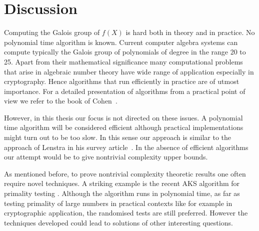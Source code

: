 \documentclass[11pt]{madras}%
\theoremstyle{remark}
\begin{document}
\section{Discussion}

%

Computing the Galois group of $f(X)$ is hard both in theory and in
practice. No polynomial time algorithm is known. Current computer
algebra systems can compute typically the Galois group of polynomials
of degree in the range 20 to 25. Apart {from} their mathematical
significance many computational problems that arise in algebraic
number theory have wide range of application especially in
cryptography.  Hence algorithms that run efficiently in practice are
of utmost importance.  For a detailed presentation of algorithms from
a practical point of view we refer to the book of
Cohen~\cite{cohen:1993}.

However, in this thesis our focus is not directed on these issues. A
polynomial time algorithm will be considered efficient although
practical implementations might turn out to be too slow.  In this
sense our approach is similar to the approach of Lenstra in his survey
article~\cite{lenstra92algorithm}. In the absence of efficient
algorithms our attempt would be to give nontrivial complexity upper
bounds.

As mentioned before, to prove nontrivial complexity theoretic results
one often require novel techniques. A striking example is the recent
AKS algorithm for primality testing \cite{agrawal2004primes}. Although
the algorithm runs in polynomial time, as far as testing primality of
large numbers in practical contexts like for example in cryptographic
application, the randomised tests are still preferred. However the
techniques developed could lead to solutions of other interesting
questions.
\end{document}
